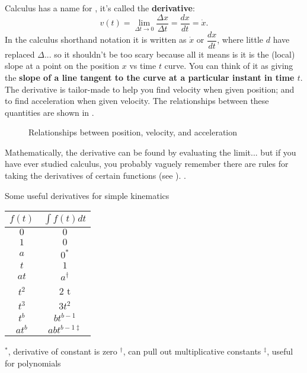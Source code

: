 \documentclass{tufte-handout}
\begin{document}
Calculus has a name for , it's called the \textbf{derivative}:
\begin{equation}
v(t) = \lim_{\Delta t\to 0} \dfrac{\Delta x}{\Delta t} = \dfrac{dx}{dt}=\dot{x}.
\label{eq:derivatives3}
\end{equation}
In the calculus shorthand notation it is written as $\dot{x}$ or $\dfrac{dx}{dt}$, where little $d$ have replaced $\Delta$... so it shouldn't be too scary because all it means is it is the (local) slope at a point on the position $x$ vs time $t$ curve. You can think of it as giving the \textbf{slope of a line tangent to the curve at a particular instant in time $t$}. The derivative is tailor-made to help you find velocity when given position; and to find acceleration when given velocity. The relationships between these quantities are shown in .
\begin{figure}
\caption{Relationships between position, velocity, and acceleration}
\label{fig:derivatives1}
\end{figure}
Mathematically, the derivative can be found by evaluating the limit... but if you have ever studied calculus, you probably vaguely remember there are rules for taking the derivatives of certain functions (see ). . 
\begin{margintable}
\caption{Some useful derivatives for simple kinematics}
\label{tab:derivatives}
\begin{center}
\small
\begin{tabular}{cc}
\toprule
$f(t)$ & $\int f(t) dt$ \\
\midrule
$0$ & $0$ \\
$1$ & $0$ \\
$a$ & $0^*$\\
$t$ & $1$ \\
$at$ & $a^\dag$\\
$t^2$ & $2$ t \\
$t^3$ & $3 t^2$ \\
$t^b$ & $b t^{b-1}$ \\
$at^b$ & $a b t^{b-1 \ddag}$\\
\bottomrule
\end{tabular}
\end{center}
\scriptsize
$^*$, derivative of constant is zero
$^\dag$, can pull out multiplicative constants
$^\ddag$, useful for polynomials  
\end{margintable}
\end{document}
